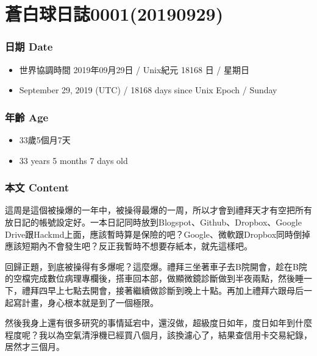 \documentclass[a5paper, 12pt
]{book}
\date{}
\providecommand{\tightlist}{%
  \setlength{\itemsep}{0pt}\setlength{\parskip}{0pt}}
\begin{document}
\tableofcontents
\clearpage

\hypertarget{ux84bcux767dux7403ux65e5ux8a8c000120190929}{%
\section{蒼白球日誌0001(20190929)}\label{ux84bcux767dux7403ux65e5ux8a8c000120190929}}

\hypertarget{ux65e5ux671f-date}{%
\subsubsection{日期 Date}\label{ux65e5ux671f-date}}

\begin{itemize}
\tightlist
\item
  世界協調時間 2019年09月29日 / Unix紀元 18168 日 / 星期日
\item
  September 29, 2019 (UTC) / 18168 days since Unix Epoch / Sunday
\end{itemize}

\hypertarget{ux5e74ux9f61-age}{%
\subsubsection{年齡 Age}\label{ux5e74ux9f61-age}}

\begin{itemize}
\tightlist
\item
  33歲5個月7天
\item
  33 years 5 months 7 days old
\end{itemize}

\hypertarget{ux672cux6587-content}{%
\subsubsection{本文 Content}\label{ux672cux6587-content}}

這周是這個被操爆的一年中，被操得最爆的一周，所以才會到禮拜天才有空把所有放日記的帳號設定好。一本日記同時放到Blogspot、Github、Dropbox、Google
Drive跟Hackmd上面，應該暫時算是保險的吧？Google、微軟跟Dropbox同時倒掉應該短期內不會發生吧？反正我暫時不想要存紙本，就先這樣吧。

回歸正題，到底被操得有多爆呢？這麼爆。禮拜三坐著車子去B院開會，趁在B院的空檔完成數位病理專欄後，搭車回本部，做顯微鏡診斷做到半夜兩點，然後睡一下，禮拜四早上七點去開會，接著繼續做診斷到晚上十點。再加上禮拜六跟母后一起寫計畫，身心根本就是到了一個極限。

然後我身上還有很多研究的事情延宕中，還沒做，超級度日如年，度日如年到什麼程度呢？我以為空氣清淨機已經買八個月，該換濾心了，結果查信用卡交易紀錄，居然才三個月。
\end{document}
